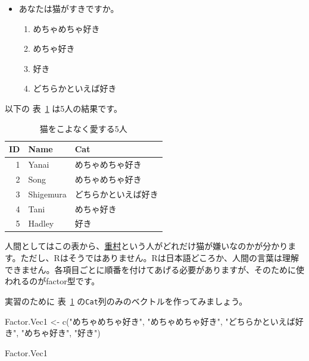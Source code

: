 \documentclass[
  a4paper,
  pandoc,
  ja=standard,
  jafont=haranoaji]{bxjsbook}
\newenvironment{Shaded}{\begin{snugshade}}{\end{snugshade}}
\newcommand{\FunctionTok}[1]{\textcolor[rgb]{0.28,0.35,0.67}{#1}}
\newcommand{\NormalTok}[1]{\textcolor[rgb]{0.00,0.48,0.65}{#1}}
\newcommand{\OtherTok}[1]{\textcolor[rgb]{0.00,0.48,0.65}{#1}}
\newcommand{\StringTok}[1]{\textcolor[rgb]{0.13,0.47,0.30}{#1}}
\providecommand{\tightlist}{%
  \setlength{\itemsep}{0pt}\setlength{\parskip}{0pt}}
\begin{document}
\begin{itemize}
\tightlist
\item
  あなたは猫がすきですか。

  \begin{enumerate}
  \def\labelenumi{\arabic{enumi}.}
  \tightlist
  \item
    めちゃめちゃ好き
  \item
    めちゃ好き
  \item
    好き
  \item
    どちらかといえば好き
  \end{enumerate}
\end{itemize}

以下の 表~\ref{tbl-cat} は5人の結果です。

\hypertarget{tbl-cat}{}
\begin{table}
\caption{\label{tbl-cat}猫をこよなく愛する5人 }

\centering
\begin{tabular}{r|l|l}
\hline
ID & Name & Cat\\
\hline
1 & Yanai & めちゃめちゃ好き\\
\hline
2 & Song & めちゃめちゃ好き\\
\hline
3 & Shigemura & どちらかといえば好き\\
\hline
4 & Tani & めちゃ好き\\
\hline
5 & Hadley & 好き\\
\hline
\end{tabular}
\end{table}

人間としてはこの表から、\href{https://soheishigemura.com}{重村}という人がどれだけ猫が嫌いなのかが分かります。ただし、Rはそうではありません。Rは日本語どころか、人間の言葉は理解できません。各項目ごとに順番を付けてあげる必要がありますが、そのために使われるのがfactor型です。

実習のために 表~\ref{tbl-cat}
の\texttt{Cat}列のみのベクトルを作ってみましょう。

\begin{Shaded}
\begin{Highlighting}[numbers=left,,]
\NormalTok{Factor.Vec1 }\OtherTok{\textless{}{-}} \FunctionTok{c}\NormalTok{(}\StringTok{"めちゃめちゃ好き"}\NormalTok{, }\StringTok{"めちゃめちゃ好き"}\NormalTok{, }
                 \StringTok{"どちらかといえば好き"}\NormalTok{, }\StringTok{"めちゃ好き"}\NormalTok{, }\StringTok{"好き"}\NormalTok{)}

\NormalTok{Factor.Vec1}
\end{Highlighting}
\end{Shaded}
\end{document}

